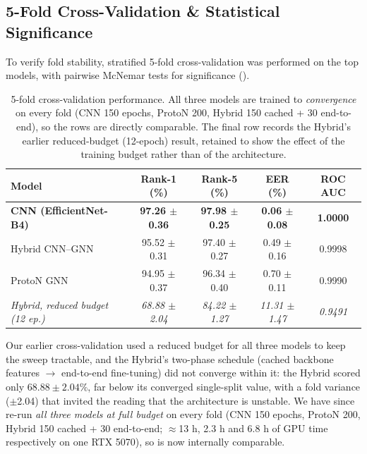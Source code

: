 \documentclass[11pt]{article}
\begin{document}
\subsection{5-Fold Cross-Validation \& Statistical Significance}
To verify fold stability, stratified 5-fold cross-validation was performed on the top
models, with pairwise McNemar tests for significance ().

\begin{table}[t]
  \centering
  \caption{5-fold cross-validation performance. All three models are trained to
  \emph{convergence} on every fold (CNN 150 epochs, ProtoN 200, Hybrid 150 cached + 30
  end-to-end), so the rows are directly comparable. The final row records the Hybrid's
  earlier reduced-budget (12-epoch) result, retained to show the effect of the training
  budget rather than of the architecture.}
  \label{tab:cv}
  \small
  \setlength{\tabcolsep}{4pt}
  \begin{tabular}{lcccc}
    \toprule
    Model & Rank-1 (\%) & Rank-5 (\%) & EER (\%) & ROC AUC \\
    \midrule
    \textbf{CNN (EfficientNet-B4)} & \textbf{97.26 $\pm$ 0.36} & \textbf{97.98 $\pm$ 0.25} & \textbf{0.06 $\pm$ 0.08} & \textbf{1.0000} \\
    Hybrid CNN--GNN & 95.52 $\pm$ 0.31 & 97.40 $\pm$ 0.27 & 0.49 $\pm$ 0.16 & 0.9998 \\
    ProtoN GNN & 94.95 $\pm$ 0.37 & 96.34 $\pm$ 0.40 & 0.70 $\pm$ 0.11 & 0.9990 \\
    \midrule
    \emph{Hybrid, reduced budget (12 ep.)} & \emph{68.88 $\pm$ 2.04} & \emph{84.22 $\pm$ 1.27} & \emph{11.31 $\pm$ 1.47} & \emph{0.9491} \\
    \bottomrule
  \end{tabular}
\end{table}

Our earlier cross-validation used a reduced budget for all three models to keep the sweep
tractable, and the Hybrid's two-phase schedule (cached backbone features $\to$ end-to-end
fine-tuning) did not converge within it: the Hybrid scored only $68.88\pm2.04\%$, far below
its converged single-split value, with a fold variance ($\pm$2.04) that invited the reading
that the architecture is unstable. We have since re-run \emph{all three models at full
budget} on every fold (CNN 150 epochs, ProtoN 200, Hybrid 150 cached + 30 end-to-end;
$\approx$13 h, 2.3 h and 6.8 h of GPU time respectively on one RTX 5070), so  is
now internally comparable.
\end{document}
